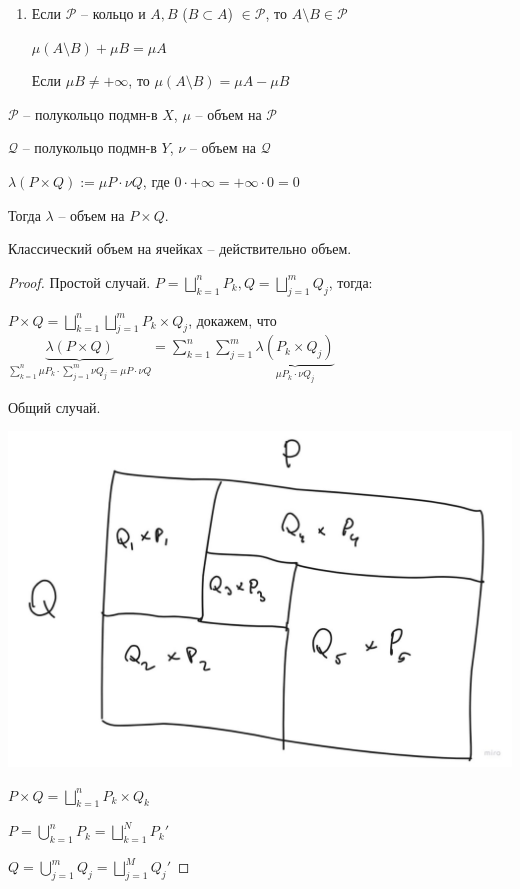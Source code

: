 \begin{remark}
    \begin{enumerate}
        \item {
            Если $\mathcal{P}$ -- кольцо и $A, B$ ($B \subset A$) $ \in \mathcal{P}$, то $A \setminus B \in \mathcal{P}$

            $\mu (A \setminus B) + \mu B = \mu A$

            Если $\mu B \neq +\infty$, то $\mu (A \setminus B) = \mu A - \mu B$
        }
    \end{enumerate}
\end{remark}

\begin{theorem}
    $\mathcal{P}$ -- полукольцо подмн-в $X$, $\mu$ -- объем на $\mathcal{P}$

    $\mathcal{Q}$ -- полукольцо подмн-в $Y$, $\nu$ -- объем на $\mathcal{Q}$

    $\lambda(P \times Q) := \mu P \cdot \nu Q$, где $0 \cdot +\infty = +\infty \cdot 0 = 0$

    Тогда $\lambda$ -- объем на $P \times Q$.
\end{theorem}
\begin{consequence}
    Классический объем на ячейках -- действительно объем.
\end{consequence}
\begin{proof}
    Простой случай. $P = \bigsqcup_{k=1}^{n}P_k, Q = \bigsqcup_{j=1}^m Q_j$, тогда:

    $P \times Q = \bigsqcup_{k=1}^{n} \bigsqcup_{j=1}^{m} P_k \times Q_j$, докажем, что $\underbrace{\lambda (P \times Q)}_{\sum_{k=1}^n \mu P_k \cdot \sum_{j=1}^m \nu Q_j = \mu P \cdot \nu Q} = \sum_{k=1}^n \sum_{j=1}^m \underbrace{\lambda (P_k \times Q_j)}_{\mu P_k \cdot \nu Q_j}$

    Общий случай.

    \begin{center}
        \includegraphics[scale=0.3]{./assets/01-measure-theory/PxQ.jpg}
    \end{center}

    $P \times Q = \bigsqcup_{k=1}^{n} P_k \times Q_k$
    
    $P = \bigcup_{k=1}^{n} P_k = \bigsqcup_{k=1}^{N} P_k'$

    $Q = \bigcup_{j=1}^{m} Q_j = \bigsqcup_{j=1}^{M} Q_j'$
\end{proof}

